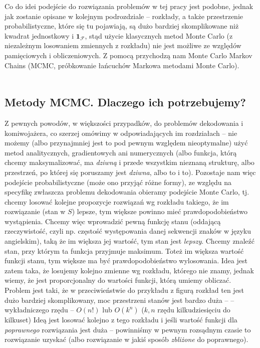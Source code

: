 \documentclass[a4paper]{article}
\theoremstyle{defn}
\theoremstyle{theorem}
\theoremstyle{lemma}
\theoremstyle{cor}
\theoremstyle{fact}
\begin{document}
Co do idei podejście do rozwiązania problemów w tej pracy jest podobne, jednak jak zostanie opisane w kolejnym podrozdziale – rozkłady, a także przestrzenie probabilistyczne, które się tu pojawiają, są dużo bardziej skomplikowane niż kwadrat jednostkowy i $\mathbf{1}_{\mathcal{F}}$, stąd użycie klasycznych metod Monte Carlo (z niezależnym losowaniem zmiennych z rozkładu) nie jest możliwe ze względów pamięciowych i obliczeniowych. Z pomocą przychodzą nam Monte Carlo Markov Chains (MCMC, próbkowanie łańcuchów Markowa metodami Monte Carlo).
\\\\
\subsection{Metody MCMC. Dlaczego ich potrzebujemy?}
Z pewnych powodów, w większości przypadków, do problemów dekodowania i komiwojażera, co szerzej omówimy w odpowiadających im rozdziałach – nie możemy (albo przynajmniej jest to pod pewnym względem nieoptymalne) użyć metod analitycznych, gradientowych ani numerycznych (albo funkcja, którą chcemy maksymalizować, ma \textit{dziwną} i przede wszystkim nieznaną strukturę, albo przestrzeń, po której się poruszamy jest \textit{dziwna}, albo to i to). Pozostaje nam więc podejście probabilistyczne (może ono przyjąć różne formy), ze względu na specyfikę zwłaszcza problemu dekodowania obieramy podejście Monte Carlo, tj. chcemy losować kolejne propozycje rozwiązań wg rozkładu takiego, że im rozwiązanie (stan w $S$) lepsze, tym większe powinno mieć prawdopodobieństwo wystąpienia.
Chcemy więc wprowadzić pewną funkcję stanu (oddającą rzeczywistość, czyli np. częstość występowania danej sekwencji znaków w języku angielskim), taką że im większa jej wartość, tym stan jest \textit{lepszy}. Chcemy znaleźć stan, przy którym ta funkcja przyjmuje maksimum. Toteż im większa wartość funkcji stanu, tym większe ma być prawdopodobieństwo wylosowania. Idea jest zatem taka, że losujemy kolejno zmienne wg rozkładu, którego nie znamy, jednak wiemy, że jest proporcjonalny do wartości funkcji, którą umiemy obliczać. Problem jest taki, że w przeciwieństwie do przykładu z figurą rozkład ten jest dużo bardziej skomplikowany, moc przestrzeni stanów jest bardzo duża – – wykładniczego rzędu – $O(n!)$ lub $O(k^n)$ ($k, n$ rzędu kilkudziesięciu do kilkuset) Ideą jest losować kolejno z tego rozkładu i jeśli wartość funkcji dla \textit{poprawnego} rozwiązania jest duża – powinniśmy w pewnym rozsądnym czasie to rozwiązanie uzyskać (albo rozwiązanie w jakiś sposób \textit{zbliżone} do poprawnego).
\end{document}
